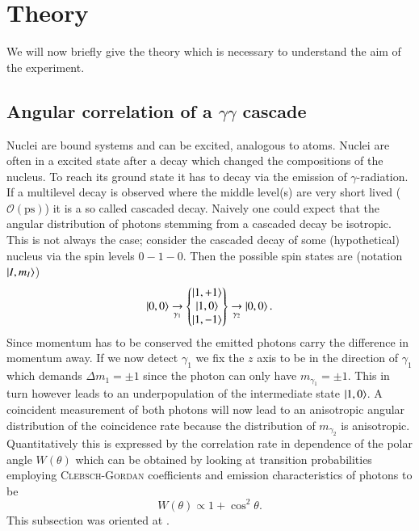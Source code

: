 \documentclass[11pt,a4paper,notitlepage]{scrartcl}
\begin{document}
\section{Theory}
\label{sec:theo}
We will now briefly give the theory which is necessary to understand the aim of the experiment.
\subsection{Angular correlation of a $\gamma\gamma$ cascade}
Nuclei are bound systems and can be excited, analogous to atoms. Nuclei are often in a excited state after a decay which changed the compositions of the nucleus. To reach its ground state it has to decay via the emission of $\gamma$-radiation. If a multilevel decay is observed where the middle level(s) are very short lived ($\mathcal{O}(\si{\pico\s})$) it is a so called cascaded decay. Naively one could expect that the angular distribution of photons stemming from a cascaded decay be isotropic. This is not always the case; consider the cascaded decay of some (hypothetical) nucleus via the spin levels $0-1-0$. Then the possible spin states are (notation $\ket{I,m_I}$)
$$\ket{0,0}\underset{\gamma_1}{\to}
\begin{Bmatrix}
	\ket{1,+1}\\
	\ket{1,0}\\
	\ket{1,-1}\\
\end{Bmatrix}
\underset{\gamma_2}{\to}\ket{0,0}.$$
Since momentum has to be conserved the emitted photons carry the difference in momentum away. If we now detect $\gamma_1$ we fix the $z$ axis to be in the direction of $\gamma_1$ which demands $\Delta m_1=\pm1$ since the photon can only have $m_{\gamma_1}=\pm1$. This in turn however leads to an underpopulation of the intermediate state $\ket{1,0}$. A coincident measurement of both photons will now lead to an anisotropic angular distribution of the coincidence rate because the distribution of $m_{\gamma_2}$ is anisotropic. Quantitatively this is expressed by the correlation rate  in dependence of the polar angle $W(\theta)$ which can be obtained by looking at transition probabilities employing \textsc{Clebsch-Gordan} coefficients and emission characteristics of photons to be \cite{nuclear} \begin{equation}
	W(\theta)\propto1+\cos^2\theta.
\end{equation} This subsection was oriented at \cite{nuclear}.
\end{document}

